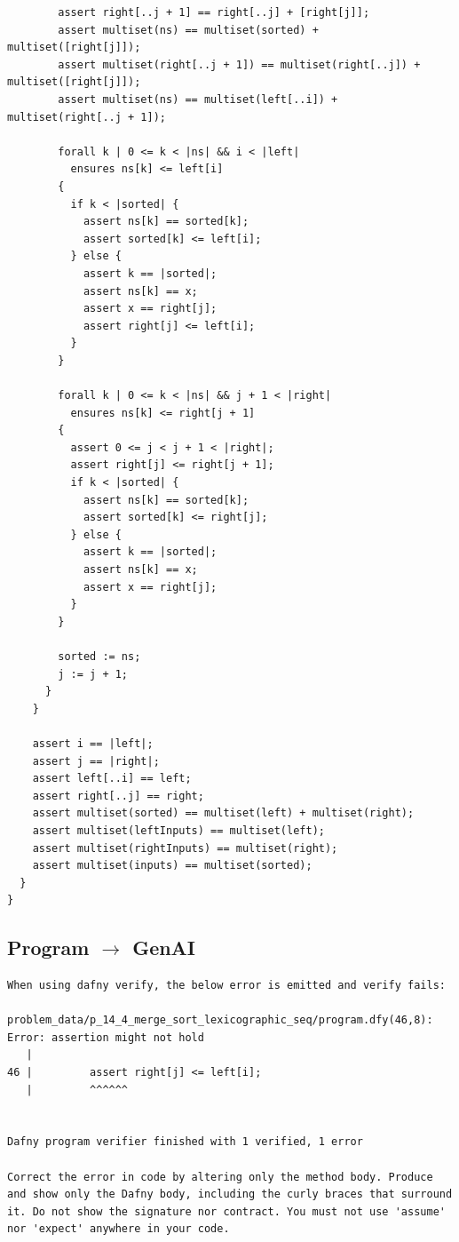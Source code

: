 \documentclass{article}
\begin{document}
\begin{lstlisting}
        assert right[..j + 1] == right[..j] + [right[j]];
        assert multiset(ns) == multiset(sorted) + multiset([right[j]]);
        assert multiset(right[..j + 1]) == multiset(right[..j]) + multiset([right[j]]);
        assert multiset(ns) == multiset(left[..i]) + multiset(right[..j + 1]);

        forall k | 0 <= k < |ns| && i < |left|
          ensures ns[k] <= left[i]
        {
          if k < |sorted| {
            assert ns[k] == sorted[k];
            assert sorted[k] <= left[i];
          } else {
            assert k == |sorted|;
            assert ns[k] == x;
            assert x == right[j];
            assert right[j] <= left[i];
          }
        }

        forall k | 0 <= k < |ns| && j + 1 < |right|
          ensures ns[k] <= right[j + 1]
        {
          assert 0 <= j < j + 1 < |right|;
          assert right[j] <= right[j + 1];
          if k < |sorted| {
            assert ns[k] == sorted[k];
            assert sorted[k] <= right[j];
          } else {
            assert k == |sorted|;
            assert ns[k] == x;
            assert x == right[j];
          }
        }

        sorted := ns;
        j := j + 1;
      }
    }

    assert i == |left|;
    assert j == |right|;
    assert left[..i] == left;
    assert right[..j] == right;
    assert multiset(sorted) == multiset(left) + multiset(right);
    assert multiset(leftInputs) == multiset(left);
    assert multiset(rightInputs) == multiset(right);
    assert multiset(inputs) == multiset(sorted);
  }
}
\end{lstlisting}
\subsection*{Program $\rightarrow$ GenAI}
\begin{lstlisting}
When using dafny verify, the below error is emitted and verify fails:

problem_data/p_14_4_merge_sort_lexicographic_seq/program.dfy(46,8): Error: assertion might not hold
   |
46 |         assert right[j] <= left[i];
   |         ^^^^^^


Dafny program verifier finished with 1 verified, 1 error

Correct the error in code by altering only the method body. Produce and show only the Dafny body, including the curly braces that surround it. Do not show the signature nor contract. You must not use 'assume' nor 'expect' anywhere in your code.
\end{lstlisting}
\end{document}
